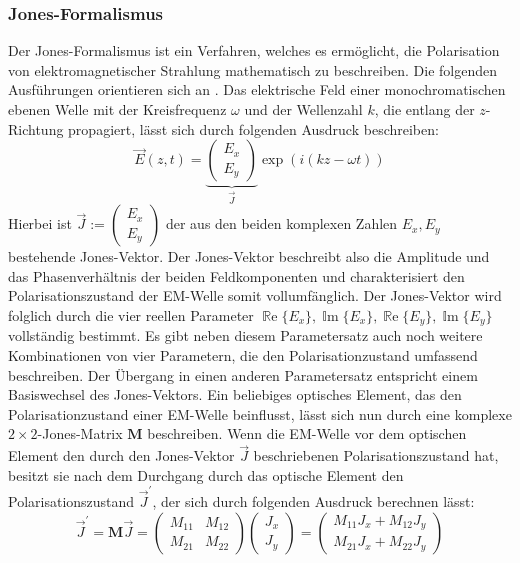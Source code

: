 \documentclass[a4paper, titlepage,  ngerman, fullpage]{book}
\renewcommand{\Re}{\operatorname{\mathbb{R}e}}
\renewcommand{\Im}{\operatorname{\mathbb{I}m}}
\begin{document}
	\subsubsection{Jones-Formalismus}
	Der Jones-Formalismus ist ein Verfahren, welches es ermöglicht, die Polarisation von elektromagnetischer Strahlung mathematisch zu beschreiben. Die folgenden Ausführungen orientieren sich an \cite{Hecht.2018}. Das elektrische Feld einer monochromatischen ebenen Welle mit der Kreisfrequenz $\omega$ und der Wellenzahl $k$, die entlang der $z$-Richtung propagiert, lässt sich durch folgenden Ausdruck beschreiben:
	\begin{equation}
		\vec{E}(z, t) = \underbrace{\begin{pmatrix}E_x \\ E_y\end{pmatrix}}_{\vec{J}} \exp(i(kz-\omega t))
	\end{equation}
	Hierbei ist $\vec{J} := \begin{pmatrix}E_x \\ E_y\end{pmatrix}$ der aus den beiden komplexen Zahlen $E_x, E_y$ bestehende Jones-Vektor. Der Jones-Vektor beschreibt also die Amplitude und das Phasenverhältnis der beiden Feldkomponenten und charakterisiert den Polarisationszustand der EM-Welle somit vollumfänglich. Der Jones-Vektor wird folglich durch die vier reellen Parameter $\Re\{E_x\}, \Im\{E_x\}, \Re\{E_y\}, \Im\{E_y\}$ vollständig bestimmt. Es gibt neben diesem Parametersatz auch noch weitere Kombinationen von vier Parametern, die den Polarisationzustand umfassend beschreiben. Der Übergang in einen anderen Parametersatz entspricht einem Basiswechsel des Jones-Vektors.	Ein beliebiges optisches Element, das den Polarisationzustand einer EM-Welle beinflusst, lässt sich nun durch eine komplexe $2 \times 2$-Jones-Matrix $\boldsymbol{M}$ beschreiben. Wenn die EM-Welle vor dem optischen Element den durch den Jones-Vektor $\vec{J}$ beschriebenen Polarisationszustand hat, besitzt sie nach dem Durchgang durch das optische Element den Polarisationszustand $\vec{J}^\prime$, der sich durch folgenden Ausdruck berechnen lässt:
	\begin{equation}
		\vec{J}^\prime = \boldsymbol{M} \vec{J}  =  
		\begin{pmatrix}
			M_{11} & M_{12} \\
			M_{21} & M_{22}
		\end{pmatrix}
		\begin{pmatrix}
			J_x \\
			J_y
		\end{pmatrix} = 
		\begin{pmatrix}
			M_{11} J_x + M_{12} J_y \\
			M_{21} J_x + M_{22} J_y
		\end{pmatrix}		
	\end{equation}
\end{document}
